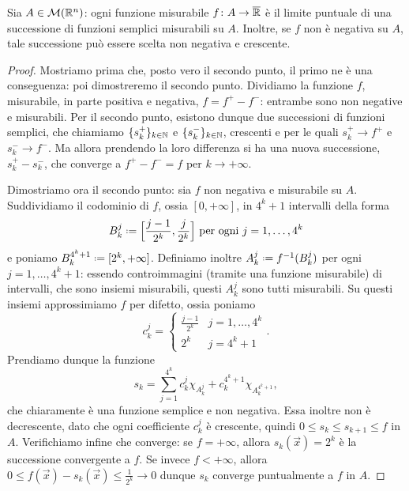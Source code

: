 \begin{teorema} \label{t:funzione-semplice-misurabile}
	Sia $A\in\mathcal M(\mathbb{R}^n)$: ogni funzione misurabile $f\colon A\to\overline{\mathbb{R}}$ è il limite puntuale di una successione di funzioni semplici misurabili su $A$.
	Inoltre, se $f$ non è negativa su $A$, tale successione può essere scelta non negativa e crescente.
\end{teorema}
\begin{proof}
	Mostriamo prima che, posto vero il secondo punto, il primo ne è una conseguenza: poi dimostreremo il secondo punto.
	Dividiamo la funzione $f$, misurabile, in parte positiva e negativa, $f=f^+-f^-$: entrambe sono non negative e misurabili.
	Per il secondo punto, esistono dunque due successioni di funzioni semplici, che chiamiamo $\{s^+_k\}_{k\in\mathbb{N}}$ e $\{s^-_k\}_{k\in\mathbb{N}}$, crescenti e per le quali
	$s^+_k\to f^+$ e $s^-_k\to f^-$.
	Ma allora prendendo la loro differenza si ha una nuova successione, $s^+_k-s^-_k$, che converge a $f^+-f^-=f$ per $k\to+\infty$.

	Dimostriamo ora il secondo punto: sia $f$ non negativa e misurabile su $A$.
	Suddividiamo il codominio di $f$, ossia $[0,+\infty]$, in $4^k+1$ intervalli della forma
	\begin{equation*}
		B^j_k\defeq\Big[\frac{j-1}{2^k},\frac{j}{2^k}\Big]\text{ per ogni }j=1,\dots,4^k
	\end{equation*}
	e poniamo $B_k^{4^k+1}\defeq[2^k,+\infty]$.
	Definiamo inoltre $A_k^j\defeq f^{-1}(B^j_k)$ per ogni $j=1,\dots,4^k+1$: essendo controimmagini (tramite una funzione misurabile) di intervalli, che sono insiemi misurabili, questi $A^j_k$ sono tutti misurabili.
	Su questi insiemi approssimiamo $f$ per difetto, ossia poniamo
	\begin{equation}
		c^j_k=
		\begin{cases}
			\frac{j-1}{2^k} &j=1,\dots,4^k\\
			2^k &j=4^k+1
		\end{cases}.
	\end{equation}
	Prendiamo dunque la funzione
	\begin{equation}
		s_k=\sum_{j=1}^{4^k}c^j_k\chi_{A^j_k}+c^{4^k+1}_k\chi_{A^{4^k+1}_k},
	\end{equation}
	che chiaramente è una funzione semplice e non negativa.
	Essa inoltre non è decrescente, dato che ogni coefficiente $c^j_k$ è crescente, quindi $0\leq s_k\leq s_{k+1}\leq f$ in $A$.
	Verifichiamo infine che converge: se $f=+\infty$, allora $s_k(\vec x)=2^k$ è la successione convergente a $f$.
	Se invece $f<+\infty$, allora $0\leq f(\vec x)-s_k(\vec x)\leq \frac1{2^k}\to 0$ dunque $s_k$ converge puntualmente a $f$ in $A$.
\end{proof}

